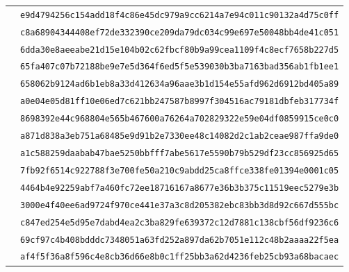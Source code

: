 {\begin{longtable}{L{0.36\textwidth}L{0.58\textwidth}}
 & \texttt{e9d4794256c154add18f4c86e45dc979}\allowbreak\texttt{a9cc6214a7e94c011c90132a4d75c0ff}\\
 & \texttt{c8a68904344408ef72de332390ce209d}\allowbreak\texttt{a79dc034c99e697e50048bb4de41c051}\\
 & \texttt{6dda30e8aeeabe21d15e104b02c62fbc}\allowbreak\texttt{f80b9a99cea1109f4c8ecf7658b227d5}\\
 & \texttt{65fa407c07b72188be9e7e5d364f6ed5}\allowbreak\texttt{f5e539030b3ba7163bad356ab1fb1ee1}\\
 & \texttt{658062b9124ad6b1eb8a33d412634a96}\allowbreak\texttt{aae3b1d154e55afd962d6912bd405a89}\\
 & \texttt{a0e04e05d81ff10e06ed7c621bb24758}\allowbreak\texttt{7b8997f304516ac79181dbfeb317734f}\\
 & \texttt{8698392e44c968804e565b467600a762}\allowbreak\texttt{64a702829322e59e04df0859915ce0c0}\\
 & \texttt{a871d838a3eb751a68485e9d91b2e733}\allowbreak\texttt{0ee48c14082d2c1ab2ceae987ffa9de0}\\
 & \texttt{a1c588259daabab47bae5250bbfff7ab}\allowbreak\texttt{e5617e5590b79b529df23cc856925d65}\\
 & \texttt{7fb92f6514c922788f3e700fe50a210c}\allowbreak\texttt{9abdd25ca8ffce338fe01394e0001c05}\\
 & \texttt{4464b4e92259abf7a460fc72ee187161}\allowbreak\texttt{67a8677e36b3b375c11519eec5279e3b}\\
 & \texttt{3000e4f40ee6ad9724f970ce441e37a3}\allowbreak\texttt{c8d205382ebc83bb3d8d92c667d555bc}\\
 & \texttt{c847ed254e5d95e7dabd4ea2c3ba829f}\allowbreak\texttt{e639372c12d7881c138cbf56df9236c6}\\
 & \texttt{69cf97c4b408bdddc7348051a63fd252}\allowbreak\texttt{a897da62b7051e112c48b2aaaa22f5ea}\\
 & \texttt{af4f5f36a8f596c4e8cb36d66e8b0c1f}\allowbreak\texttt{f25bb3a62d4236feb25cb93a68bacaec}\\

\end{longtable}}
